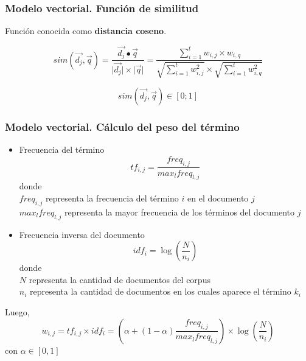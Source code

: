 \documentclass[
	10pt, %
	aspectratio=169, %
]{beamer}
\providecommand{\abs}[1]{\lvert#1\rvert}
\begin{document}

\begin{frame}
	
	\frametitle{Modelo vectorial. Función de similitud}
	
	Función conocida como \textbf{distancia coseno}.
	
	\centering
	$$
		sim(\vec{d_j}, \vec{q}) 
		= \frac{ \vec{d_j} \bullet \vec{q}}{ \abs{\vec{d_j}} \times \abs{\vec{q}}}
		= \frac{\sum_{i=1}^{t} w_{i, j} \times w_{i, q}}{\sqrt{\sum_{i=1}^{t} w_{i, j}^2} \times \sqrt{\sum_{i=1}^{t} w_{i, q}^2}} 
	$$
	
	$$sim(\vec{d_j}, \vec{q}) \in [0; 1]$$
	
	\end{frame}


\begin{frame}
	
	\frametitle{Modelo vectorial. Cálculo del peso del término}
	
	\begin{itemize}
		
		\item Frecuencia del término  
		$$tf_{i, j} = \frac{freq_{i,j}}{max_l freq_{l, j}}$$
		donde \\
		\hspace*{4mm} $freq_{i,j}$ representa la frecuencia del término $i$ en el documento $j$ \\
		\hspace*{4mm} $max_l freq_{l, j}$ representa la mayor frecuencia de los términos del documento $j$ 
		
		\pause
		\item Frecuencia inversa del documento 
		$$idf_i = \log(\frac{N}{n_i})$$
		donde \\ 
		\hspace*{4mm} $N$ representa la cantidad de documentos del corpus \\
		\hspace*{4mm} $n_i$ representa la cantidad de documentos en los cuales aparece el término $k_i$
		
	\end{itemize}
	
	\pause
	Luego, 
	$$w_{i,j} = tf_{i, j} \times idf_i =(\alpha + (1 - \alpha) \frac{freq_{i,j}}{max_l freq_{l, j}}) \times \log(\frac{N}{n_i}) $$
	con $\alpha \in [0, 1]$
	
\end{frame}
\end{document}
